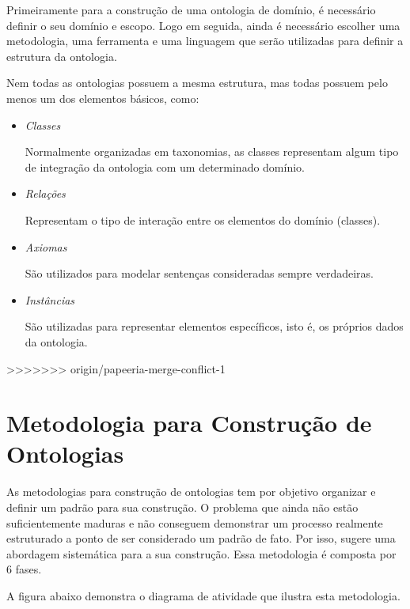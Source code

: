 Primeiramente para a construção de uma ontologia de domínio, é necessário definir
o seu domínio e escopo. Logo em seguida, ainda é necessário escolher uma 
metodologia, uma ferramenta e uma linguagem que serão utilizadas para definir a 
estrutura da ontologia. 

Nem todas as ontologias possuem a mesma estrutura, mas todas possuem pelo menos 
um dos elementos básicos, como:

\begin{itemize}
    \item \textit{Classes}
    
    Normalmente organizadas em taxonomias, as classes representam algum tipo de
    integração da ontologia com um determinado domínio.
    
    \item \textit{Relações}
    
    Representam o tipo de interação entre os elementos do domínio (classes).
    
    \item \textit{Axiomas}
    
    São utilizados para modelar sentenças consideradas sempre verdadeiras.
    
    \item \textit{Instâncias}
    
    São utilizadas para representar elementos específicos, isto é, os próprios 
    dados da ontologia.
\end{itemize}

>>>>>>> origin/papeeria-merge-conflict-1
\section{Metodologia para Construção de Ontologias}
\label{sec:metodologias_para_construcao_de_ontologias}

As metodologias para construção de ontologias tem por objetivo organizar e definir
um padrão para sua construção. O problema que ainda não estão suficientemente
maduras e não conseguem demonstrar um processo realmente estruturado a ponto de 
ser considerado um padrão de fato. Por isso, \cite{guizzardidesenvolvimento} 
sugere uma abordagem sistemática para a sua construção. Essa metodologia é 
composta por 6 fases.

A figura abaixo demonstra o diagrama de atividade que ilustra esta metodologia.

